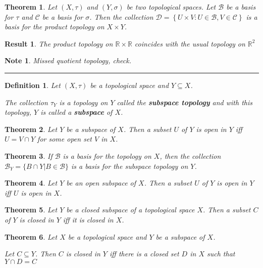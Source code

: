 \documentclass[14pt,twoside]{extreport}
\newcommand{\hhrule}{\vspace{1cm}\hrule\vspace{1cm}}
\theoremstyle{dotless}
\newtheorem*{defn}{Definition}
\newtheorem*{thm}{Theorem} %
\newtheorem*{note}{Note} %
\newtheorem*{result}{Result} %
\begin{document}
\begin{thm}
    Let $\left (X, \tau\right )$ and $\left (Y, \sigma\right )$ be two topological spaces. Let $\mathcal{B}$ be a basis for $\tau$ and $\mathcal{C}$ be a basis for $\sigma$.
    Then the collection $\mathcal{D} = \left\{ U \times V  :  U \in \mathcal{B}, V \in \mathcal{C} \right\}$ is a basis for the product topology on $X \times Y$.
\end{thm}

\begin{result}
    The product topology on $\mathbb{R} \times \mathbb{R}$ coincides with the usual topology on $\mathbb{R}^2$
\end{result}

\begin{note}
    Missed quotient topology, check.
\end{note}
\hhrule

\begin{defn}
    Let $(X, \tau)$ be a topological space and $Y \subseteq X$.
    
    The collection $\tau_Y$ is a topology on $Y$ called the \textbf{subspace topology} and with this topology, $Y$ is called a \textbf{subspace} of $X$.
\end{defn}

\begin{thm}
    Let $Y$ be a subspace of $X$. Then a subset $U$ of $Y$ is open in $Y$ iff $U = V \cap Y$ for some open set $V$ in $X$.
\end{thm}

\begin{thm}
    If $\mathscr{B}$ is a basis for the topology on $X$, then the collection $\mathscr{B}_Y = \{ B \cap Y  | B \in \mathscr{B} \}$ is a basis for the subspace topology on $Y$.
\end{thm}



\begin{thm}
    Let $Y$ be an open subspace of $X$. Then a subset $U$ of $Y$ is open in $Y$ iff $U$ is open in $X$.
\end{thm}

\begin{thm}
    Let $Y$ be a closed subspace of a topological space $X$. Then a subset $C$ of $Y$ is closed in $Y$ iff it is closed in $X$.
\end{thm}

\begin{thm}
    Let $X$ be a topological space and $Y$ be a subspace of $X$.

    Let $C \subseteq Y$. Then $C$ is closed in $Y$ iff there is a closed set $D$ in $X$ such that $Y \cap D = C$
\end{thm}
\end{document}
